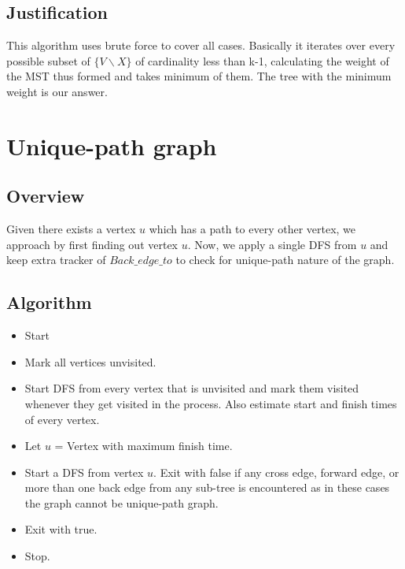 \documentclass{article}
\begin{document}
\subsection{Justification}
This algorithm uses brute force to cover all cases. Basically it iterates over every possible subset of $\{V\backslash X\}$ of cardinality less than k-1, calculating the weight of the MST thus formed and takes minimum of them. The tree with the minimum weight is our answer.\\  

\newpage
\section{Unique-path graph}
\subsection{Overview}
Given there exists a vertex $u$ which has a path to every other vertex, we approach by first finding out vertex $u$. Now, we apply a single DFS from $u$ and keep extra tracker of $Back\_edge\_to$ to check for unique-path nature of the graph.
\subsection{Algorithm}
\begin{itemize}
\item Start
\item Mark all vertices unvisited. 
\item Start DFS from every vertex that is unvisited and mark them visited whenever they get visited in the process. Also estimate start and finish times of every vertex.
\item Let $u$ = Vertex with maximum finish time.
\item Start a DFS from vertex $u$. Exit with false if any cross edge, forward edge, or more than one back edge from any sub-tree is encountered as in these cases the graph cannot be unique-path graph.
\item Exit with true.
\item Stop.  
\end{itemize}
\end{document}
